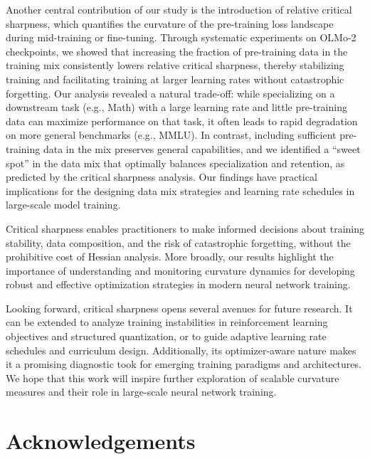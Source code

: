 \documentclass[]{fairmeta}
\theoremstyle{plain}
\theoremstyle{definition}
\begin{document}
Another central contribution of our study is the introduction of relative critical sharpness, which quantifies the curvature of the pre-training loss landscape during mid-training or fine-tuning. Through systematic experiments on OLMo-2 checkpoints, we showed that increasing the fraction of pre-training data in the training mix consistently lowers relative critical sharpness, thereby stabilizing training and facilitating training at larger learning rates without catastrophic forgetting. Our analysis revealed a natural trade-off: while specializing on a downstream task (e.g., Math) with a large learning rate and little pre-training data can maximize performance on that task, it often leads to rapid degradation on more general benchmarks (e.g., MMLU). In contrast, including sufficient pre-training data in the mix preserves general capabilities, and we identified a ``sweet spot'' in the data mix that optimally balances specialization and retention, as predicted by the critical sharpness analysis.
Our findings have practical implications for the designing data mix strategies and learning rate schedules in large-scale model training. 

Critical sharpness enables practitioners to make informed decisions about training stability, data composition, and the risk of catastrophic forgetting, without the prohibitive cost of Hessian analysis. More broadly, our results highlight the importance of understanding and monitoring curvature dynamics for developing robust and effective optimization strategies in modern neural network training.

Looking forward, critical sharpness opens several avenues for future research. It can be extended to analyze training instabilities in reinforcement learning objectives and structured quantization, or to guide adaptive learning rate schedules and curriculum design. Additionally, its optimizer-aware nature makes it a promising diagnostic took for emerging training paradigms and architectures. We hope that this work will inspire further exploration of scalable curvature measures and their role in large-scale neural network training.


\section*{Acknowledgements}
\end{document}
